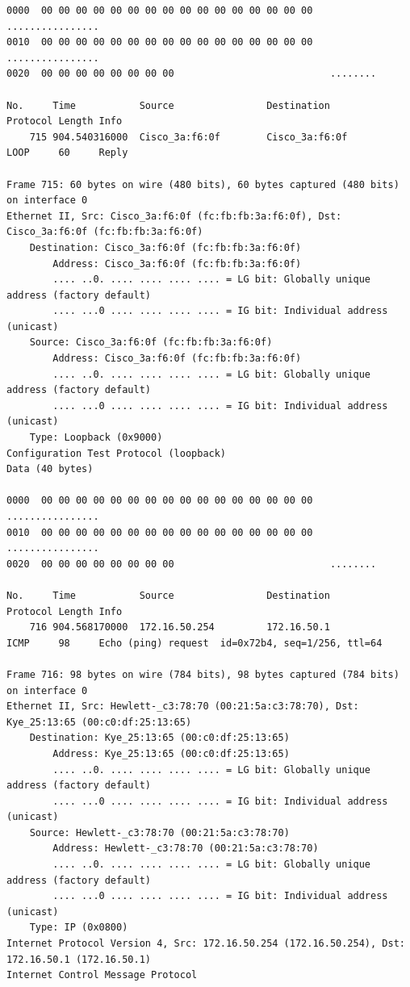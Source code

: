 \documentclass[a4paper,11pt]{article}
\begin{document}
\begin{lstlisting}
0000  00 00 00 00 00 00 00 00 00 00 00 00 00 00 00 00   ................
0010  00 00 00 00 00 00 00 00 00 00 00 00 00 00 00 00   ................
0020  00 00 00 00 00 00 00 00                           ........

No.     Time           Source                Destination           Protocol Length Info
    715 904.540316000  Cisco_3a:f6:0f        Cisco_3a:f6:0f        LOOP     60     Reply

Frame 715: 60 bytes on wire (480 bits), 60 bytes captured (480 bits) on interface 0
Ethernet II, Src: Cisco_3a:f6:0f (fc:fb:fb:3a:f6:0f), Dst: Cisco_3a:f6:0f (fc:fb:fb:3a:f6:0f)
    Destination: Cisco_3a:f6:0f (fc:fb:fb:3a:f6:0f)
        Address: Cisco_3a:f6:0f (fc:fb:fb:3a:f6:0f)
        .... ..0. .... .... .... .... = LG bit: Globally unique address (factory default)
        .... ...0 .... .... .... .... = IG bit: Individual address (unicast)
    Source: Cisco_3a:f6:0f (fc:fb:fb:3a:f6:0f)
        Address: Cisco_3a:f6:0f (fc:fb:fb:3a:f6:0f)
        .... ..0. .... .... .... .... = LG bit: Globally unique address (factory default)
        .... ...0 .... .... .... .... = IG bit: Individual address (unicast)
    Type: Loopback (0x9000)
Configuration Test Protocol (loopback)
Data (40 bytes)

0000  00 00 00 00 00 00 00 00 00 00 00 00 00 00 00 00   ................
0010  00 00 00 00 00 00 00 00 00 00 00 00 00 00 00 00   ................
0020  00 00 00 00 00 00 00 00                           ........

No.     Time           Source                Destination           Protocol Length Info
    716 904.568170000  172.16.50.254         172.16.50.1           ICMP     98     Echo (ping) request  id=0x72b4, seq=1/256, ttl=64

Frame 716: 98 bytes on wire (784 bits), 98 bytes captured (784 bits) on interface 0
Ethernet II, Src: Hewlett-_c3:78:70 (00:21:5a:c3:78:70), Dst: Kye_25:13:65 (00:c0:df:25:13:65)
    Destination: Kye_25:13:65 (00:c0:df:25:13:65)
        Address: Kye_25:13:65 (00:c0:df:25:13:65)
        .... ..0. .... .... .... .... = LG bit: Globally unique address (factory default)
        .... ...0 .... .... .... .... = IG bit: Individual address (unicast)
    Source: Hewlett-_c3:78:70 (00:21:5a:c3:78:70)
        Address: Hewlett-_c3:78:70 (00:21:5a:c3:78:70)
        .... ..0. .... .... .... .... = LG bit: Globally unique address (factory default)
        .... ...0 .... .... .... .... = IG bit: Individual address (unicast)
    Type: IP (0x0800)
Internet Protocol Version 4, Src: 172.16.50.254 (172.16.50.254), Dst: 172.16.50.1 (172.16.50.1)
Internet Control Message Protocol


\end{lstlisting}
\end{document}
